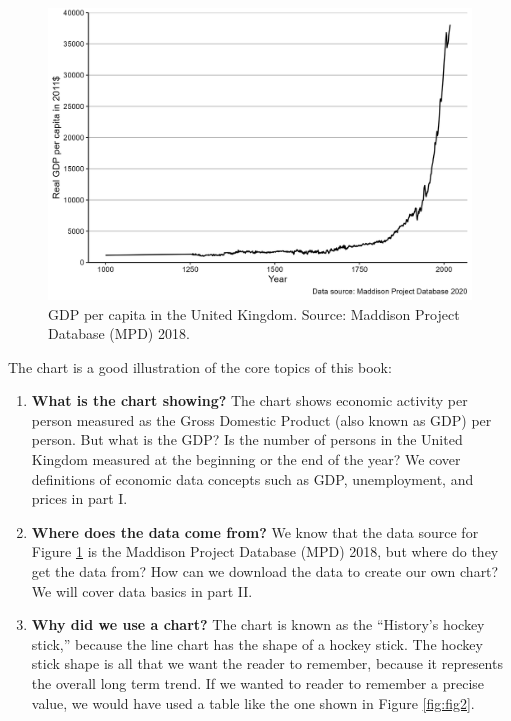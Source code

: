 \documentclass[
]{book}
\begin{document}
\begin{figure}

{\centering \includegraphics[width=0.95\linewidth]{./resources/chapter_introduction/fig1} 

}

\caption{GDP per capita in the United Kingdom. Source: Maddison Project Database (MPD) 2018.}\label{fig:fig1}
\end{figure}

The chart is a good illustration of the core topics of this book:

\begin{enumerate}
\def\labelenumi{\arabic{enumi}.}
\item
  \textbf{What is the chart showing?} The chart shows economic activity per person measured as the Gross Domestic Product (also known as GDP) per person. But what is the GDP? Is the number of persons in the United Kingdom measured at the beginning or the end of the year? We cover definitions of economic data concepts such as GDP, unemployment, and prices in part I.
\item
  \textbf{Where does the data come from?} We know that the data source for Figure \ref{fig:fig1} is the Maddison Project Database (MPD) 2018, but where do they get the data from? How can we download the data to create our own chart? We will cover data basics in part II.
\item
  \textbf{Why did we use a chart?} The chart is known as the ``History's hockey stick,'' because the line chart has the shape of a hockey stick. The hockey stick shape is all that we want the reader to remember, because it represents the overall long term trend. If we wanted to reader to remember a precise value, we would have used a table like the one shown in Figure \ref{fig:fig2}.
\end{enumerate}
\end{document}
